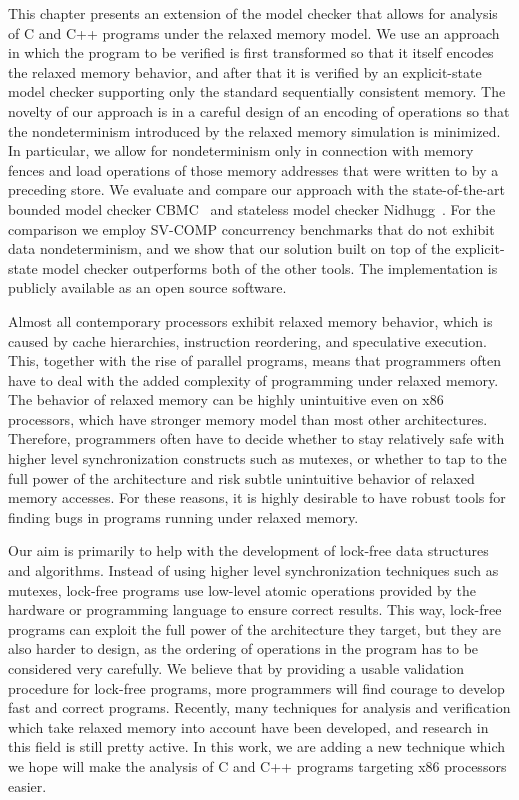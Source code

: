 
\bigskip\noindent
This chapter presents an extension of the \divine model checker that allows for
analysis of C and C++ programs under the \xtso relaxed memory model.
We use an approach in which the program to be verified is first transformed so
that it itself encodes the relaxed memory behavior, and after that it is
verified by an explicit-state model checker supporting only the standard
sequentially consistent memory.
The novelty of our approach is in a careful design of an encoding of \xtso
operations so that the nondeterminism introduced by the relaxed memory
simulation is minimized.
In particular, we allow for nondeterminism only in connection with memory
fences and load operations of those memory addresses that were written to by a
preceding store.
We evaluate and compare our approach with the state-of-the-art bounded model
checker CBMC~ and stateless model checker Nidhugg~.
For the comparison we employ SV-COMP concurrency benchmarks that do not exhibit
data nondeterminism, and we show that our solution built on top of the
explicit-state model checker outperforms both of the other tools.
The implementation is publicly available as an open source software.

Almost all contemporary processors exhibit relaxed memory behavior, which is
caused by cache hierarchies, instruction reordering, and speculative execution.
This, together with the rise of parallel programs, means that programmers often have to deal with the added complexity of programming under relaxed memory.
The behavior of relaxed memory can be highly unintuitive even on x86 processors, which have stronger memory model than most other architectures.
Therefore, programmers often have to decide whether to stay relatively safe with
higher level synchronization constructs such as mutexes, or whether to tap to the full power of the architecture and risk subtle unintuitive behavior of relaxed memory accesses.
For these reasons, it is highly desirable to have robust tools for finding bugs in programs running under relaxed memory.

Our aim is primarily to help with the development of lock-free data structures and algorithms.
Instead of using higher level synchronization techniques such as mutexes, lock-free programs use low-level atomic operations provided by the hardware or programming language to ensure correct results.
This way, lock-free programs can exploit the full power of the architecture they target, but they are also harder to design, as the ordering of operations in the program has to be considered very carefully.
We believe that by providing a usable validation procedure for lock-free
programs, more programmers will find courage to develop fast and correct programs.
Recently, many techniques for analysis and verification which take relaxed memory into account have been developed, and research in this field is still pretty active.
In this work, we are adding a new technique which we hope will make the analysis of C and C++ programs targeting x86 processors easier.

